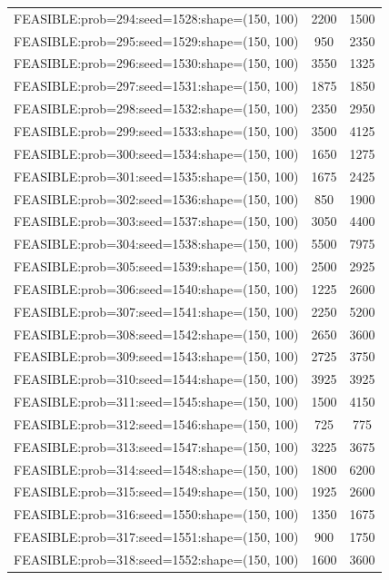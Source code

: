 \begin{longtable}{lcc}
FEASIBLE:prob=294:seed=1528:shape=(150, 100) &     2200 &  1500 \\
FEASIBLE:prob=295:seed=1529:shape=(150, 100) &      950 &  2350 \\
FEASIBLE:prob=296:seed=1530:shape=(150, 100) &     3550 &  1325 \\
FEASIBLE:prob=297:seed=1531:shape=(150, 100) &     1875 &  1850 \\
FEASIBLE:prob=298:seed=1532:shape=(150, 100) &     2350 &  2950 \\
FEASIBLE:prob=299:seed=1533:shape=(150, 100) &     3500 &  4125 \\
FEASIBLE:prob=300:seed=1534:shape=(150, 100) &     1650 &  1275 \\
FEASIBLE:prob=301:seed=1535:shape=(150, 100) &     1675 &  2425 \\
FEASIBLE:prob=302:seed=1536:shape=(150, 100) &      850 &  1900 \\
FEASIBLE:prob=303:seed=1537:shape=(150, 100) &     3050 &  4400 \\
FEASIBLE:prob=304:seed=1538:shape=(150, 100) &     5500 &  7975 \\
FEASIBLE:prob=305:seed=1539:shape=(150, 100) &     2500 &  2925 \\
FEASIBLE:prob=306:seed=1540:shape=(150, 100) &     1225 &  2600 \\
FEASIBLE:prob=307:seed=1541:shape=(150, 100) &     2250 &  5200 \\
FEASIBLE:prob=308:seed=1542:shape=(150, 100) &     2650 &  3600 \\
FEASIBLE:prob=309:seed=1543:shape=(150, 100) &     2725 &  3750 \\
FEASIBLE:prob=310:seed=1544:shape=(150, 100) &     3925 &  3925 \\
FEASIBLE:prob=311:seed=1545:shape=(150, 100) &     1500 &  4150 \\
FEASIBLE:prob=312:seed=1546:shape=(150, 100) &      725 &   775 \\
FEASIBLE:prob=313:seed=1547:shape=(150, 100) &     3225 &  3675 \\
FEASIBLE:prob=314:seed=1548:shape=(150, 100) &     1800 &  6200 \\
FEASIBLE:prob=315:seed=1549:shape=(150, 100) &     1925 &  2600 \\
FEASIBLE:prob=316:seed=1550:shape=(150, 100) &     1350 &  1675 \\
FEASIBLE:prob=317:seed=1551:shape=(150, 100) &      900 &  1750 \\
FEASIBLE:prob=318:seed=1552:shape=(150, 100) &     1600 &  3600 \\

\end{longtable}
